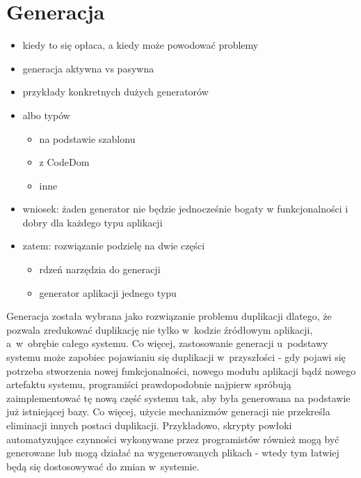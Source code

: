 \chapter{Generacja} \label{chap:generation}

\begin{itemize}
 \item kiedy to się opłaca, a kiedy może powodować problemy
 \item generacja aktywna vs pasywna
 \item przykłady konkretnych dużych generatorów
 \item albo typów
  \begin{itemize}
   \item na podstawie szablonu
   \item z CodeDom
   \item inne
  \end{itemize}
 \item wniosek: żaden generator nie będzie jednocześnie bogaty w funkcjonalności i dobry dla każdego typu aplikacji
 \item zatem: rozwiązanie podzielę na dwie części
  \begin{itemize}
   \item rdzeń narzędzia do generacji
   \item generator aplikacji jednego typu
  \end{itemize}
\end{itemize}

Generacja została wybrana jako rozwiązanie problemu duplikacji dlatego, że pozwala zredukować duplikację nie tylko w~kodzie źródłowym aplikacji, a~w~obrębie całego systemu.
Co więcej, zastosowanie generacji u~podstawy systemu może zapobiec pojawianiu się duplikacji w~przyszłości - gdy pojawi się potrzeba stworzenia nowej funkcjonalności, nowego modułu aplikacji bądź nowego artefaktu systemu, programiści prawdopodobnie najpierw spróbują zaimplementować tę nową część systemu tak, aby była generowana na podstawie już istniejącej bazy.
Co więcej, użycie mechanizmów generacji nie przekreśla eliminacji innych postaci duplikacji.
Przykładowo, skrypty powłoki automatyzujące czynności wykonywane przez programistów również mogą być generowane lub mogą działać na wygenerowanych plikach - wtedy tym łatwiej będą się dostosowywać do zmian w~systemie.